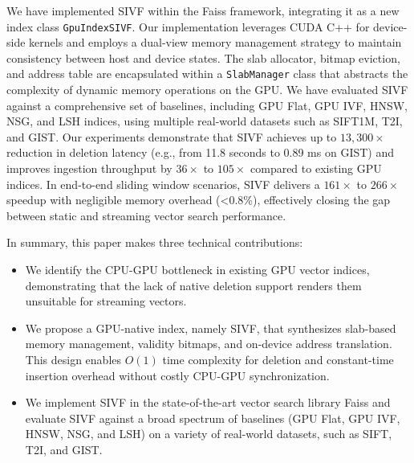 \documentclass[sigconf,anonymous]{acmart}
\theoremstyle{plain}
\theoremstyle{definition}
\theoremstyle{remark}
\begin{document}
We have implemented SIVF within the Faiss framework, integrating it as a new index class \texttt{GpuIndexSIVF}. Our implementation leverages CUDA C++ for device-side kernels and employs a dual-view memory management strategy to maintain consistency between host and device states. The slab allocator, bitmap eviction, and address table are encapsulated within a \texttt{SlabManager} class that abstracts the complexity of dynamic memory operations on the GPU. We have evaluated SIVF against a comprehensive set of baselines, including GPU Flat, GPU IVF, HNSW, NSG, and LSH indices, using multiple real-world datasets such as SIFT1M, T2I, and GIST. Our experiments demonstrate that SIVF achieves up to $13,300\times$ reduction in deletion latency (e.g., from 11.8 seconds to 0.89 ms on GIST) and improves ingestion throughput by $36\times$ to $105\times$ compared to existing GPU indices. In end-to-end sliding window scenarios, SIVF delivers a $161\times$ to $266\times$ speedup with negligible memory overhead (<0.8\%), effectively closing the gap between static and streaming vector search performance.


In summary, this paper makes three technical contributions:
\begin{itemize}
    \item We identify the CPU-GPU bottleneck in existing GPU vector indices, demonstrating that the lack of native deletion support renders them unsuitable for streaming vectors.
    
    \item We propose a GPU-native index, namely SIVF, that synthesizes slab-based memory management, validity bitmaps, and on-device address translation. This design enables $O(1)$ time complexity for deletion and constant-time insertion overhead without costly CPU-GPU synchronization.
    
    \item We implement SIVF in the state-of-the-art vector search library Faiss and evaluate SIVF against a broad spectrum of baselines (GPU Flat, GPU IVF, HNSW, NSG, and LSH) on a variety of real-world datasets, such as SIFT, T2I, and GIST.
\end{itemize}

\end{document}
